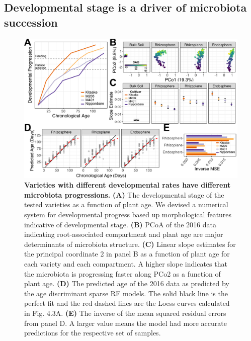 \subsection{Developmental stage is a driver of microbiota succession}
\begin{figure}[tbh]
\centering
\includegraphics[width=6in]{Figures/figure3_5}
\caption[Figure 4.5]{\textbf{Varieties with different developmental rates have different microbiota progressions.} \textbf{(A)} The developmental stage of the tested varieties as a function of plant age. We devised a numerical system for developmental progress based up morphological features indicative of developmental stage. \textbf{(B)} PCoA of the 2016 data indicating root-associated compartment and plant age are major determinants of microbiota structure. \textbf{(C)} Linear slope estimates for the principal coordinate 2 in panel B as a function of plant age for each variety and each compartment. A higher slope indicates that the microbiota is progressing faster along PCo2 as a function of plant age. \textbf{(D)} The predicted age of the 2016 data as predicted by the age discriminant sparse RF models. The solid black line is the perfect fit and the red dashed lines are the Loess curves calculated in Fig. 4.3A. \textbf{(E)} The inverse of the mean squared residual errors from panel D. A larger value means the model had more accurate predictions for the respective set of samples.}
\label{Figure 4.5}
\end{figure}

